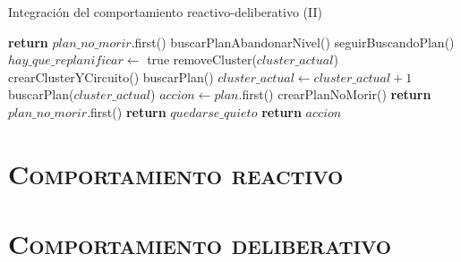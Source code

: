 \documentclass[11pt,a4paper]{article}
\begin{document}
\begin{algorithm}[H]
\caption{Integración del comportamiento reactivo-deliberativo (II)}
\begin{algorithmic}[1]
\EndIf
\State {}
	\State \textbf{return} $plan\_no\_morir$.first()
\EndIf
{} 
	\State buscarPlanAbandonarNivel()
\EndIf
{} 
	\State seguirBuscandoPlan()
\EndIf
{}
	\State $hay\_que\_replanificar \gets $ true
		\State removeCluster($cluster\_actual$) 
		\State crearClusterYCircuito() 
	\EndIf
\EndIf
{}
	\State buscarPlan()
\EndIf
{}
		\State $cluster\_actual \gets cluster\_actual + 1$
		\State buscarPlan($cluster\_actual$)
	\Else
		\State $accion \gets plan$.first()
	\EndIf
\EndIf
\State {}
	\State crearPlanNoMorir()
	\State \textbf{return} $plan\_no\_morir$.first()
\EndIf
{}
	\State \textbf{return} $quedarse\_quieto$
\EndIf
\State \textbf{return} $accion$
\EndProcedure
\end{algorithmic}
\end{algorithm}

\section{\textsc{Comportamiento reactivo}}

\section{\textsc{Comportamiento deliberativo}}
\end{document}
